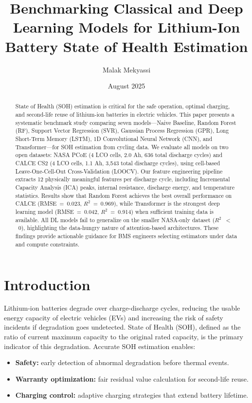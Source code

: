 \documentclass[11pt,a4paper]{article}
\title{Benchmarking Classical and Deep Learning Models for Lithium-Ion Battery State of Health Estimation}
\author{Malak Mekyassi}
\date{August 2025}
\begin{document}
\maketitle

\begin{abstract}
State of Health (SOH) estimation is critical for the safe operation, optimal charging, and second-life reuse of lithium-ion batteries in electric vehicles. This paper presents a systematic benchmark study comparing seven models---Naive Baseline, Random Forest (RF), Support Vector Regression (SVR), Gaussian Process Regression (GPR), Long Short-Term Memory (LSTM), 1D Convolutional Neural Network (CNN), and Transformer---for SOH estimation from cycling data. We evaluate all models on two open datasets: NASA PCoE (4 LCO cells, 2.0 Ah, 636 total discharge cycles) and CALCE CS2 (4 LCO cells, 1.1 Ah, 3,543 total discharge cycles), using cell-based Leave-One-Cell-Out Cross-Validation (LOOCV). Our feature engineering pipeline extracts 12 physically meaningful features per discharge cycle, including Incremental Capacity Analysis (ICA) peaks, internal resistance, discharge energy, and temperature statistics. Results show that Random Forest achieves the best overall performance on CALCE (RMSE~=~0.023, $R^2$~=~0.969), while Transformer is the strongest deep learning model (RMSE~=~0.042, $R^2$~=~0.914) when sufficient training data is available. All DL models fail to generalize on the smaller NASA-only dataset ($R^2$~$<$~0), highlighting the data-hungry nature of attention-based architectures. These findings provide actionable guidance for BMS engineers selecting estimators under data and compute constraints.
\end{abstract}

\section{Introduction}
\label{sec:introduction}

Lithium-ion batteries degrade over charge-discharge cycles, reducing the usable energy capacity of electric vehicles (EVs) and increasing the risk of safety incidents if degradation goes undetected. State of Health (SOH), defined as the ratio of current maximum capacity to the original rated capacity, is the primary indicator of this degradation. Accurate SOH estimation enables:

\begin{itemize}[nosep]
    \item \textbf{Safety:} early detection of abnormal degradation before thermal events.
    \item \textbf{Warranty optimization:} fair residual value calculation for second-life reuse.
    \item \textbf{Charging control:} adaptive charging strategies that extend battery lifetime.
\end{itemize}
\end{document}
